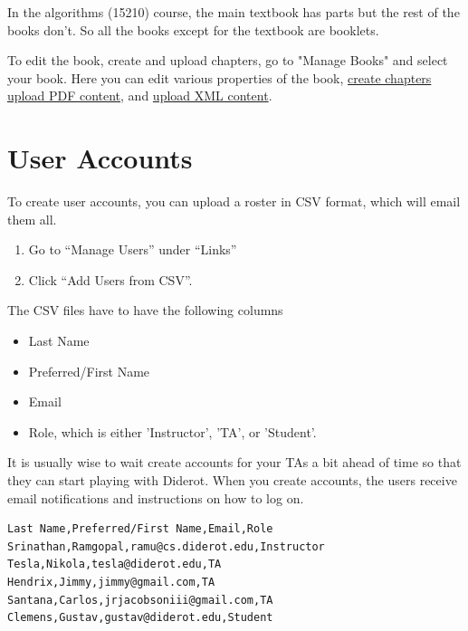 \begin{example}
In the algorithms (15210) course, the main textbook has parts but
the rest of the books don't.  So all the books except for the textbook are booklets.
\end{example}


\begin{gram}
To edit the book, create and upload chapters, go to "Manage Books" and select your book.  Here you can edit various properties of the book, 
%
\href{guide:chapter::create}{create chapters}
%
\href{guide:chapter::upload-pdf}{upload PDF content}, and
\href{guide:chapter::upload-xml}{upload XML content}.
\end{gram}


\section{User Accounts} 

\begin{gram}[Creation]
To create user accounts, you can upload a roster in CSV format, which will email them all.
%
\begin{enumerate}
\item
Go to ``Manage Users'' under ``Links'' 
\item
Click ``Add Users from CSV''.
\end{enumerate}

The CSV files have to have the following columns
\begin{itemize}
\item Last Name
\item Preferred/First Name
\item Email
\item Role, which is either 'Instructor', 'TA', or 'Student'. 
\end{itemize} 

%
It is usually wise to wait create accounts for your TAs a bit ahead of time so that they can start playing with Diderot. 
%
When you create accounts, the users receive email notifications and instructions on how to log on.
\end{gram}

\begin{example}
\begin{lstlisting}
Last Name,Preferred/First Name,Email,Role
Srinathan,Ramgopal,ramu@cs.diderot.edu,Instructor
Tesla,Nikola,tesla@diderot.edu,TA
Hendrix,Jimmy,jimmy@gmail.com,TA
Santana,Carlos,jrjacobsoniii@gmail.com,TA
Clemens,Gustav,gustav@diderot.edu,Student
\end{lstlisting}

\end{example}

